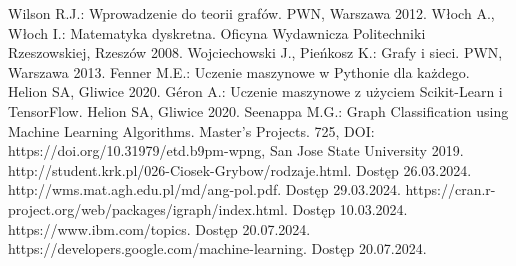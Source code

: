 
\begin{thebibliography}{4}
 Wilson R.J.: Wprowadzenie do teorii grafów. PWN, Warszawa 2012.
 Włoch A., Włoch I.: Matematyka dyskretna. Oficyna Wydawnicza Politechniki Rzeszowskiej, Rzeszów 2008.
 Wojciechowski J., Pieńkosz K.: Grafy i sieci. PWN, Warszawa 2013.
 Fenner M.E.: Uczenie maszynowe w Pythonie dla każdego. Helion SA, Gliwice 2020.
 Géron A.: Uczenie maszynowe z użyciem Scikit-Learn i TensorFlow. Helion SA, Gliwice 2020.
 Seenappa M.G.: Graph Classification using Machine Learning Algorithms. Master's Projects. 725, DOI: https://doi.org/10.31979/etd.b9pm-wpng, San Jose State University 2019.
 http://student.krk.pl/026-Ciosek-Grybow/rodzaje.html. Dostęp 26.03.2024.
 http://wms.mat.agh.edu.pl/\texttildelow md/ang-pol.pdf. Dostęp 29.03.2024. 
 https://cran.r-project.org/web/packages/igraph/index.html. Dostęp 10.03.2024.
 https://www.ibm.com/topics. Dostęp 20.07.2024.
 https://developers.google.com/machine-learning. Dostęp 20.07.2024.
\end{thebibliography}